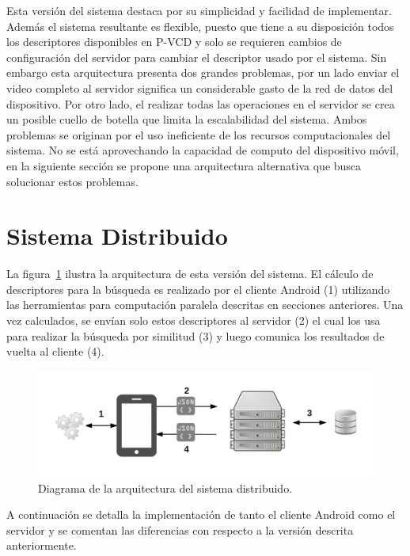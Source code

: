 Esta versión del sistema destaca por su simplicidad y facilidad de implementar. Además el sistema resultante es flexible, puesto que tiene a su disposición todos los descriptores disponibles en P-VCD y solo se requieren cambios de configuración del servidor para cambiar el descriptor usado por el sistema. Sin embargo esta arquitectura presenta dos grandes problemas, por un lado enviar el video completo al servidor significa un considerable gasto de la red de datos del dispositivo. Por otro lado, el realizar todas las operaciones en el servidor se crea un posible cuello de botella que limita la escalabilidad del sistema. Ambos problemas se originan por el uso ineficiente de los recursos computacionales del sistema. No se está aprovechando la capacidad de computo del dispositivo móvil, en la siguiente sección se propone una arquitectura alternativa que busca solucionar estos problemas.


\section{Sistema Distribuido}\label{distr}

La figura~\ref{arquitectura_distribuida} ilustra la arquitectura de esta versión del sistema. El cálculo de descriptores para la búsqueda es realizado por el cliente Android (1) utilizando las herramientas para computación paralela descritas en secciones anteriores. Una vez calculados, se envían solo estos descriptores al servidor (2) el cual los usa para realizar la búsqueda por similitud (3) y luego comunica los resultados de vuelta al cliente (4).

	\begin{figure}[!h]
		\centering
		\includegraphics[scale=1]{imagenes/cap4/arquitectura_distribuida.png}
		\caption{Diagrama de la arquitectura del sistema distribuido.}
		\label{arquitectura_distribuida}
	\end{figure}

A continuación se detalla la implementación de tanto el cliente Android como el servidor y se comentan las diferencias con respecto a la versión descrita anteriormente.

